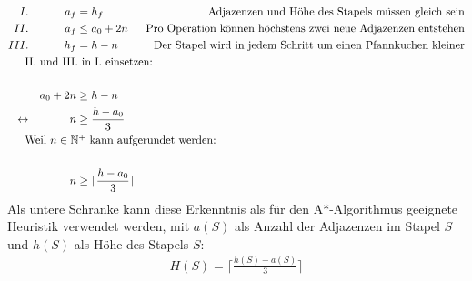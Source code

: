 \documentclass[a4paper,10pt,ngerman]{scrartcl}
\begin{document}
\begin{align*}
  I.              &  & a_f      & = h_f                              & \text{Adjazenzen und Höhe des Stapels müssen gleich sein}            \\
  II.             &  & a_f      & \leq a_0 + 2n                      & \text{Pro Operation können höchstens zwei neue Adjazenzen entstehen} \\
  III.            &  & h_f      & = h - n                            & \text{Der Stapel wird in jedem Schritt um einen Pfannkuchen kleiner} \\
  \noalign{II. und III. in I. einsetzen:}                                                                                                   \\
                  &  & a_0 + 2n & \geq h - n                         &                                                                      \\
  \leftrightarrow &  & n        & \geq \frac{h - a_0}{3}                                                                                    \\
  \noalign{Weil $n \in \mathbb{N}^+$ kann aufgerundet werden:}                                                                              \\
                  &  & n        & \geq \lceil\frac{h - a_0}{3}\rceil                                                                        \\
\end{align*}
Als untere Schranke kann diese Erkenntnis als für den A*-Algorithmus geeignete Heuristik verwendet werden,
mit $a(S)$ als Anzahl der Adjazenzen im Stapel $S$ und $h(S)$ als Höhe des Stapels $S$:
\begin{align*}
  H(S) = \lceil\frac{h(S) - a(S)}{3}\rceil
\end{align*}
\end{document}
